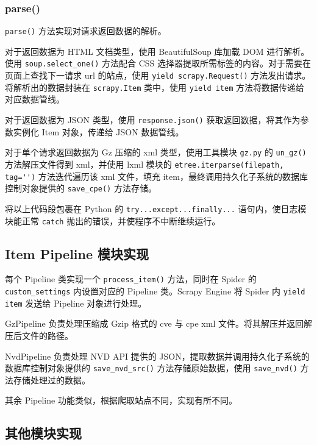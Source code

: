 \documentclass[a4paper,AutoFakeBold,oneside,12pt]{book}
\begin{document}
\subsubsection{parse()}

\lstinline[style = python]|parse()| 方法实现对请求返回数据的解析。

对于返回数据为 HTML 文档类型，使用 BeautifulSoup 库加载 DOM 进行解析。使用 \lstinline[style = python]|soup.select_one()| 方法配合 CSS 选择器提取所需标签的内容。对于需要在页面上查找下一请求 url 的站点，使用 \lstinline[style = python]|yield scrapy.Request()| 方法发出请求。将解析出的数据封装在 \lstinline[style = python]|scrapy.Item| 类中，使用 \lstinline[style = python]|yield item| 方法将数据传递给对应数据管线。

对于返回数据为 JSON 类型，使用 \lstinline[style = python]|response.json()| 获取返回数据，将其作为参数实例化 Item 对象，传递给 JSON 数据管线。

对于单个请求返回数据为 Gz 压缩的 xml 类型，使用工具模块 \lstinline[style = python]|gz.py| 的 \lstinline[style = python]|un_gz()| 方法解压文件得到 xml，并使用 lxml 模块的 \lstinline[style = python]|etree.iterparse(filepath, tag='')| 方法迭代遍历该 xml 文件，填充 item，最终调用持久化子系统的数据库控制对象提供的 \lstinline[style = python]|save_cpe()| 方法存储。

将以上代码段包裹在 Python 的 \lstinline|try...except...finally...| 语句内，使日志模块能正常 \lstinline|catch| 抛出的错误，并使程序不中断继续运行。

\subsection{Item Pipeline 模块实现}

每个 Pipeline 类实现一个 \lstinline[style = python]|process_item()| 方法，同时在 Spider 的 \lstinline[style = python]|custom_settings| 内设置对应的 Pipeline 类。Scrapy Engine 将 Spider 内 \lstinline[style = python]|yield item| 发送给 Pipeline 对象进行处理。

GzPipeline 负责处理压缩成 Gzip 格式的 cve 与 cpe xml 文件。将其解压并返回解压后文件的路径。

NvdPipeline 负责处理 NVD API 提供的 JSON，提取数据并调用持久化子系统的数据库控制对象提供的 \lstinline|save_nvd_src()| 方法存储原始数据，使用 \lstinline|save_nvd()| 方法存储处理过的数据。

其余 Pipeline 功能类似，根据爬取站点不同，实现有所不同。

\subsection{其他模块实现}
\end{document}
